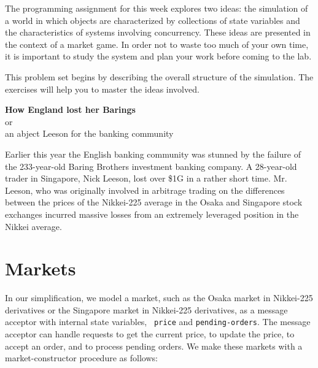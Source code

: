 
 
\def\fbox#1{%
 \vtop{\vbox{\hrule%
    \hbox{\vrule\kern3pt%
\vtop{\vbox{\kern3pt#1}\kern3pt}%
\kern3pt\vrule}}%
\hrule}}




\medskip

The programming assignment for this week explores two ideas: the
simulation of a world in which objects are characterized by
collections of state variables and the characteristics of systems
involving concurrency.  These ideas are presented in the context of a
market game.  In order not to waste too much of your own time, it is
important to study the system and plan your work before coming to the
lab.

This problem set begins by describing the overall structure of the
simulation.  The exercises will help you to master the ideas involved.

\begin{center}
{\bf How England lost her Barings } \\
or \\
an abject Leeson for the banking community
\end{center}

Earlier this year the English banking community was stunned by the
failure of the 233-year-old Baring Brothers investment banking
company.  A 28-year-old trader in Singapore, Nick Leeson, lost over
\$1G in a rather short time.  Mr. Leeson, who was originally involved
in arbitrage trading on the differences between the prices of the
Nikkei-225 average in the Osaka and Singapore stock exchanges incurred
massive losses from an extremely leveraged position in the Nikkei
average.

\section{Markets}

In our simplification, we model a market, such as the Osaka market in
Nikkei-225 derivatives or the Singapore market in Nikkei-225
derivatives, as a message acceptor with internal state variables, {\tt
price} and {\tt pending-orders}.  The message acceptor can handle
requests to get the current price, to update the price, to accept an
order, and to process pending orders.  We make these markets with a
market-constructor procedure as follows:

